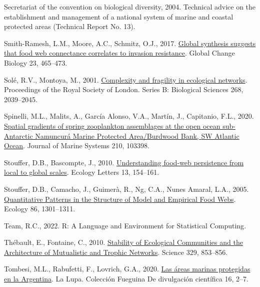 \documentclass[preprint, 3p,
authoryear]{elsarticle} %
\newlength{\cslhangindent}
\newlength{\cslentryspacingunit} %
\newenvironment{CSLReferences}[2] %
 {%
  \setlength{\parindent}{0pt}
  \ifodd #1
  \let\oldpar\par
  \def\par{\hangindent=\cslhangindent\oldpar}
  \fi
  \setlength{\parskip}{#2\cslentryspacingunit}
 }%
 {}
\begin{document}
\begin{CSLReferences}{1}{0}
\leavevmode{}%
Secretariat of the convention on biological diversity, 2004. Technical
advice on the establishment and management of a national system of
marine and coastal protected areas (Technical Report No. 13).

\leavevmode{}%
Smith-Ramesh, L.M., Moore, A.C., Schmitz, O.J., 2017.
\href{https://doi.org/10.1111/gcb.13460}{Global synthesis suggests that
food web connectance correlates to invasion resistance}. Global Change
Biology 23, 465--473.

\leavevmode{}%
Solé, R.V., Montoya, M., 2001.
\href{https://doi.org/10.1098/rspb.2001.1767}{Complexity and fragility
in ecological networks}. Proceedings of the Royal Society of London.
Series B: Biological Sciences 268, 2039--2045.

\leavevmode{}%
Spinelli, M.L., Malits, A., García Alonso, V.A., Martín, J., Capitanio,
F.L., 2020. \href{https://doi.org/10.1016/j.jmarsys.2020.103398}{Spatial
gradients of spring zooplankton assemblages at the open ocean
sub-{Antarctic Namuncurá Marine Protected Area}/{Burdwood Bank}, {SW
Atlantic Ocean}}. Journal of Marine Systems 210, 103398.

\leavevmode{}%
Stouffer, D.B., Bascompte, J., 2010.
\href{https://doi.org/10.1111/j.1461-0248.2009.01407.x}{Understanding
food-web persistence from local to global scales}. Ecology Letters 13,
154--161.

\leavevmode{}%
Stouffer, D.B., Camacho, J., Guimerà, R., Ng, C.A., Nunes Amaral, L.A.,
2005. \href{https://doi.org/10.1890/04-0957}{Quantitative {Patterns} in
the {Structure} of {Model} and {Empirical Food Webs}}. Ecology 86,
1301--1311.

\leavevmode{}%
Team, R.C., 2022. R: {A Language} and {Environment} for {Statistical
Computing}.

\leavevmode{}%
Thébault, E., Fontaine, C., 2010.
\href{https://doi.org/10.1126/science.1188321}{Stability of {Ecological
Communities} and the {Architecture} of {Mutualistic} and {Trophic
Networks}}. Science 329, 853--856.

\leavevmode{}%
Tombesi, M.L., Rabufetti, F., Lovrich, G.A., 2020.
\href{https://www.coleccionlalupa.com.ar/index.php/lalupa/article/view/79}{Las
áreas marinas protegidas en la {Argentina}}. La Lupa. Colección Fueguina
De divulgación científica 16, 2--7.


\end{CSLReferences}
\end{document}
